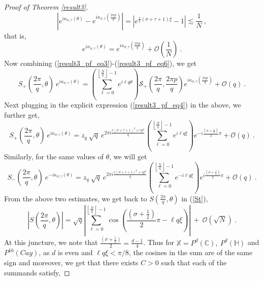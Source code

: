 \documentclass[12pt]{amsart}
\theoremstyle{definition}
\newcommand{\C}{\mathbb C}%
\newcommand{\X}{\mathbb X}%
\newcommand{\Hb}{\mathbb H}%
\numberwithin{equation}{section}
\begin{document}
\begin{proof}[Proof of Theorem \ref{result3}]
\begin{equation*}
\left|e^{i\kappa_{\sigma,\tau}(\theta)}-e^{i\kappa_{\sigma,\tau}\left(\frac{2\pi p}{q}\right)}\right|=\left|e^{\frac{i}{2}(\sigma + \tau +1)\xi}-1\right| \lesssim \frac{1}{N}\:,
\end{equation*}
that is,
\begin{equation} \label{result3_pf_eq6}
e^{i\kappa_{\sigma,\tau}(\theta)} = e^{i\kappa_{\sigma,\tau}\left(\frac{2\pi p}{q}\right)} + \mathcal{O}\left(\frac{1}{N}\right)\:.
\end{equation}
Now combining (\ref{result3_pf_eq3})-(\ref{result3_pf_eq6}), we get
\begin{equation*}
S_{+}\left(\frac{2\pi}{q},\theta\right)\:e^{i\kappa_{\sigma,\tau}(\theta)} = \left(\sum_{\ell=0}^{\left\lfloor\frac{N}{q}\right\rfloor - 1} e^{i\ell q \theta}\right)\mathscr{S}_+\left(\frac{2\pi}{q},\frac{2\pi p}{q}\right)e^{i\kappa_{\sigma,\tau}\left(\frac{2\pi p}{q}\right)} + \mathcal{O}(q)\:.
\end{equation*}
Next plugging in the explicit expression (\ref{result3_pf_eq4}) in the above, we further get,
\begin{equation*}
S_{+}\left(\frac{2\pi}{q},\theta\right)\:e^{i\kappa_{\sigma,\tau}(\theta)} =z_q\: \sqrt{q}\: e^{2\pi i\frac{r(\sigma+\tau+1)^2 + rp^2}{q}} \left(\sum_{\ell=0}^{\left\lfloor\frac{N}{q}\right\rfloor - 1} e^{i\ell q \xi}\right)e^{-i\frac{\left(\sigma + \frac{1}{2}\right)}{2}\pi} + \mathcal{O}(q)\:.
\end{equation*}
Similarly, for the same values of $\theta$, we will get
\begin{equation*}
S_{-}\left(\frac{2\pi}{q},\theta\right)\:e^{-i\kappa_{\sigma,\tau}(\theta)} =z_q\: \sqrt{q}\: e^{2\pi i\frac{r(\sigma+\tau+1)^2 + rp^2}{q}} \left(\sum_{\ell=0}^{\left\lfloor\frac{N}{q}\right\rfloor - 1} e^{-i\ell q \xi}\right)e^{i\frac{\left(\sigma + \frac{1}{2}\right)}{2}\pi} + \mathcal{O}(q)\:.
\end{equation*}
From the above two estimates, we get back to $S\left(\frac{2\pi}{q},\theta \right)$ in (\ref{St}),
\begin{equation*}
\left|S\left(\frac{2\pi}{q},\theta \right)\right| = \sqrt{q}\left|\sum_{\ell=0}^{\left\lfloor\frac{N}{q}\right\rfloor - 1} \cos\left(\frac{\left(\sigma + \frac{1}{2}\right)}{2}\pi - \ell q \xi\right)\right| \:+\:\mathcal{O}\left(\sqrt{N}\right)\:.
\end{equation*}
At this juncture, we note that $\frac{\left(\sigma + \frac{1}{2}\right)}{2}=\frac{d-1}{4}$. Thus for $\X=P^d(\C),\:P^d(\Hb)$ and $P^{16}(Cay)$, as $d$ is even and $\ell q \xi < \pi/8$, the cosines in the sum are of the same sign and moreover, we get that there exists $C>0$ such that each of the summands satisfy,

\end{proof}
\end{document}
